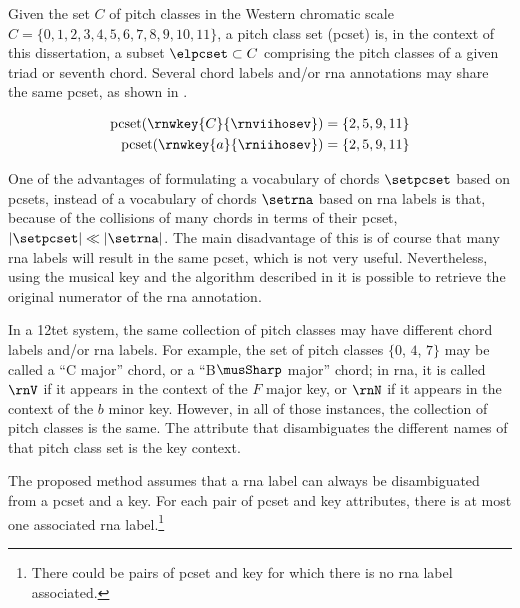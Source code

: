 
Given the set $C$ of pitch classes in the Western chromatic
scale $C = \{0, 1, 2, 3, 4, 5, 6, 7, 8, 9, 10, 11 \}$, a
pitch class set (\gls{pcset}) is, in the context of this
dissertation, a subset $\elpcset \subset C$ comprising the
pitch classes of a given triad or seventh chord. Several
chord labels and/or \gls{rna} annotations may share the same
\gls{pcset}, as shown in .

\begin{equation}
    \label{eq:pcset_collision}
    \begin{split}
        \text{pcset}(\rnwkey{C}{\rnviihosev}) &= \{2, 5, 9, 11 \}\\
        \text{pcset}(\rnwkey{a}{\rniihosev}) &= \{2, 5, 9, 11 \}
    \end{split}
\end{equation}

One of the advantages of formulating a vocabulary of chords
$\setpcset$ based on \gls{pcset}s, instead of a vocabulary
of chords $\setrna$ based on \gls{rna} labels is that,
because of the collisions of many chords in terms of their
\gls{pcset}, $| \setpcset | \ll | \setrna |$. The main
disadvantage of this is of course that many \gls{rna} labels
will result in the same \gls{pcset}, which is not very
useful. Nevertheless, using the musical key and the
algorithm described in
it is possible to retrieve the original numerator of the
\gls{rna} annotation.


In a \gls{12tet} system, the same collection of pitch
classes may have different chord labels and/or \gls{rna}
labels. For example, the set of pitch classes $\{0$, $4$,
$7\}$ may be called a ``C major'' chord, or a ``B$\musSharp$
major'' chord; in \gls{rna}, it is called $\rnV$ if it
appears in the context of the $F$ major key, or $\rnN$ if it
appears in the context of the $b$ minor key. However, in all
of those instances, the collection of pitch classes is the
same. The attribute that disambiguates the different names
of that pitch class set is the key context.

The proposed method assumes that a \gls{rna} label can
always be disambiguated from a \gls{pcset} and a key. For
each pair of \gls{pcset} and key attributes, there is at
most one associated \gls{rna} label.\footnote{There could be
pairs of \gls{pcset} and key for which there is no \gls{rna}
label associated.}

